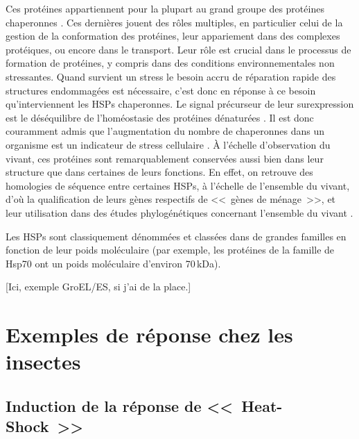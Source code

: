 	Ces protéines appartiennent pour la plupart au grand groupe des protéines chaperonnes \cite{federhoffmann1999}.
	Ces dernières jouent des rôles multiples, en particulier celui de la gestion de la conformation des protéines, leur appariement dans des complexes protéiques, ou encore dans le transport.
	Leur rôle est crucial dans le processus de formation de protéines, y compris dans des conditions environnementales non stressantes.
	Quand survient un stress le besoin accru de réparation rapide des structures endommagées est nécessaire, c'est donc en réponse à ce besoin qu'interviennent les HSPs chaperonnes.
	Le signal précurseur de leur surexpression est le déséquilibre de l'homéostasie des protéines dénaturées \cite{ananthan1986}.
	Il est donc couramment admis que l'augmentation du nombre de chaperonnes dans un organisme est un indicateur de stress cellulaire \cite{ryan1996}.
	À l'échelle d'observation du vivant, ces protéines sont remarquablement conservées aussi bien dans leur structure que dans certaines de leurs fonctions.
	En effet, on retrouve des homologies de séquence entre certaines HSPs, à l'échelle de l'ensemble du vivant, d'où la qualification de leurs gènes respectifs de <<~gènes de ménage~>>, et leur utilisation dans des études phylogénétiques concernant l'ensemble du vivant \cite{gupta1995}.

	Les HSPs sont classiquement dénommées et classées dans de grandes familles en fonction de leur poids moléculaire (par exemple, les protéines de la famille de Hsp70 ont un poids moléculaire d'environ 70\,kDa).

	[Ici, exemple GroEL/ES, si j'ai de la place.]

	\section{Exemples de réponse chez les insectes}

		\subsection{Induction de la réponse de <<~Heat-Shock~>>}
